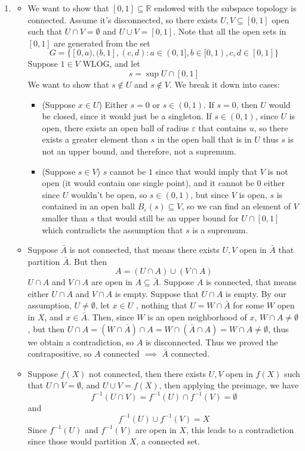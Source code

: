 \documentclass[12pt]{article}
\begin{document}
\begin{enumerate}
	\item 
		\begin{itemize}
			\item[(a)] We want to show that $[0,1] \subseteq \mathbb{R}$ endowed with the subspace topology is connected. Assume it's disconnected, so there exists $U,V \subseteq [0,1]$ open such that $U \cap V = \emptyset$ and $U \cup V = [0,1]$. Note that all the open sets in $[0,1]$ are generated from the set $$G = \{[0,a), (b,1], (c,d) \colon a \in (0,1], b \in [0,1), c,d \in [0,1]\}$$ Suppose $1 \in V$ WLOG, and let
				$$s = \sup U \cap [0,1]$$
				We want to show that $s \notin U$ and $s \notin V$. We break it down into cases:\\
				\begin{itemize} \item (Suppose $x \in U$) Either $s = 0$ or $s \in (0,1)$. If $s = 0$, then $U$ would be closed, since it would just be a singleton. If $s \in (0,1)$, since $U$ is open, there exists an open ball of radius $\varepsilon$ that contains $u$, so there exists a greater element than $s$ in the open ball that is in $U$ thus $s$ is not an upper bound, and therefore, not a supremum. 
				\item (Suppose $s \in V$) $s$ cannot be $1$ since that would imply that $V$ is not open (it would contain one single point), and it cannot be $0$ either since $U$ wouldn't be open, so $s \in (0,1)$, but since $V$ is open, $s$ is contained in an open ball $B_\varepsilon(s) \subseteq V$, so we can find an element of $V$ smaller than $s$ that would still be an upper bound for $U \cap [0,1]$ which contradicts the assumption that $s$ is a supremum. 
				\end{itemize}
			\item[(b)] Suppose $\bar{A}$ is not connected, that means there exists $U,V$ open in $\bar{A}$ that partition $\bar{A}$.  But then 
				$$A = (U \cap A) \cup (V \cap A)$$ $U \cap A$
				and $V \cap A$ are open in $A \subseteq \bar{A}$. Suppose $A$ is connected, that means either $U \cap A$ and $V \cap A$ is empty. Suppose that $U \cap A$ is empty. By our assumption, $U \neq \emptyset$, let $x \in U$ , nothing that $U = W \cap \bar{A}$ for some $W$ open in $X$, and $x \in \bar{A}$. Then, since $W$ is an open neighborhood of $x$, $W \cap A \neq \emptyset$, but then $U \cap A = (W \cap \bar{A}) \cap A = W \cap (\bar{A} \cap A) = W \cap A \neq \emptyset$, thus we obtain a contradiction, so $A$ is disconnected. Thus we proved the contrapositive, so $A$ connected $\implies$ $\bar{A}$ connected.
			\item[(c)] Suppose $f(X)$ not connected, then there exists $U,V$ open in $f(X)$ such that $U \cap V = \emptyset$, and $U \cup V = f(X)$, then applying the preimage, we have 
				$$
				f^{-1}(U \cap V) = f^{-1}(U) \cap f^{-1}(V) = \emptyset
				$$
				and 
				$$
				f^{-1}(U) \cup f^{-1}(V) = X
				$$
				Since $f^{-1}(U)$ and $f^{-1}(V)$ are open in $X$, this leads to a contradiction since those would partition $X$, a connected set. 
			

\end{itemize}
\end{enumerate}
\end{document}
